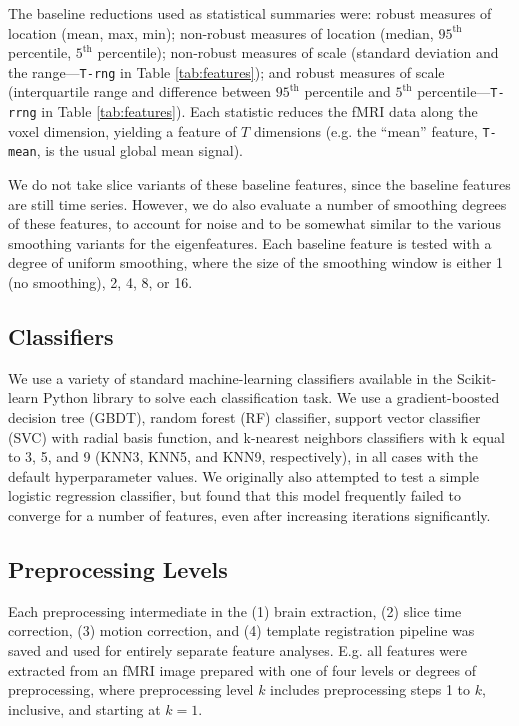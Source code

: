 \documentclass[12pt]{spieman}  %
\newcommand{\code}[1]{\small\texttt{#1}\normalsize}
\begin{document}
\begin{spacing}{2}
The baseline reductions used as statistical summaries were: robust measures of
location (mean, max, min); non-robust measures of location (median,
\(95^{\text{th}}\) percentile, \(5^{\text{th}}\) percentile); non-robust
measures of scale (standard deviation and the range—\code{T-rng} in Table
\ref{tab:features}); and robust measures of scale (interquartile range and
difference between \(95^{\text{th}}\) percentile and \(5^{\text{th}}\)
percentile—\code{T-rrng} in Table \ref{tab:features}). Each statistic reduces
the fMRI data along the voxel dimension, yielding a feature of \(T\) dimensions
(e.g. the ``mean'' feature, \code{T-mean}, is the usual global mean signal).

We do not take slice variants of these baseline features, since the baseline
features are still time series. However, we do also evaluate a number of
smoothing degrees of these features, to account for noise and to be somewhat
similar to the various smoothing variants for the eigenfeatures. Each baseline
feature is tested with a degree of uniform smoothing, where the size of the
smoothing window is either 1 (no smoothing), 2, 4, 8, or 16.


\subsection{Classifiers}

We use a variety of standard machine-learning classifiers available in the
Scikit-learn\cite{pedregosaScikitlearnMachineLearning2011} Python library to
solve each classification task. We use a gradient-boosted decision tree (GBDT),
random forest (RF) classifier, support vector classifier (SVC) with radial
basis function, and k-nearest neighbors classifiers with k equal to 3, 5, and 9
(KNN3, KNN5, and KNN9, respectively), in all cases with the default
hyperparameter values. We originally also attempted to test a simple logistic
regression classifier, but found that this model frequently failed to converge
for a number of features, even after increasing iterations significantly.

\subsection{Preprocessing Levels}

Each preprocessing intermediate in the (1) brain extraction, (2) slice time
correction, (3) motion correction, and (4) template registration pipeline was
saved and used for entirely separate feature analyses. E.g. all features were
extracted from an fMRI image prepared with one of four levels or degrees of
preprocessing, where preprocessing level \(k\) includes preprocessing steps 1 to \(k\),
inclusive, and starting at \(k = 1\).


\end{spacing}
\end{document}
